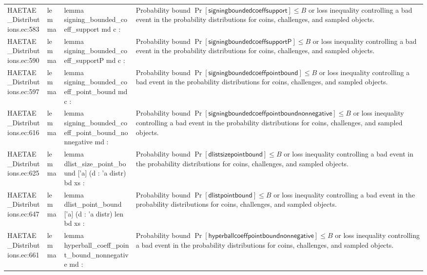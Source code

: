 \documentclass[10pt]{article}
\begin{document}
\begin{longtable}{L{0.11\textwidth}L{0.055\textwidth}L{0.385\textwidth}L{0.41\textwidth}}
HAETAE\_\allowbreak{}Distributions.\allowbreak{}ec:\allowbreak{}583 & lemma & {\ttfamily\scriptsize lemma signing\_\allowbreak{}bounded\_\allowbreak{}coeff\_\allowbreak{}support md c :} & Probability bound $\Pr[\mathsf{signingboundedcoeffsupport}]\le B$ or loss inequality controlling a bad event in the probability distributions for coins, challenges, and sampled objects. \\
HAETAE\_\allowbreak{}Distributions.\allowbreak{}ec:\allowbreak{}590 & lemma & {\ttfamily\scriptsize lemma signing\_\allowbreak{}bounded\_\allowbreak{}coeff\_\allowbreak{}supportP md c :} & Probability bound $\Pr[\mathsf{signingboundedcoeffsupportP}]\le B$ or loss inequality controlling a bad event in the probability distributions for coins, challenges, and sampled objects. \\
HAETAE\_\allowbreak{}Distributions.\allowbreak{}ec:\allowbreak{}597 & lemma & {\ttfamily\scriptsize lemma signing\_\allowbreak{}bounded\_\allowbreak{}coeff\_\allowbreak{}point\_\allowbreak{}bound md c :} & Probability bound $\Pr[\mathsf{signingboundedcoeffpointbound}]\le B$ or loss inequality controlling a bad event in the probability distributions for coins, challenges, and sampled objects. \\
HAETAE\_\allowbreak{}Distributions.\allowbreak{}ec:\allowbreak{}616 & lemma & {\ttfamily\scriptsize lemma signing\_\allowbreak{}bounded\_\allowbreak{}coeff\_\allowbreak{}point\_\allowbreak{}bound\_\allowbreak{}nonnegative md :} & Probability bound $\Pr[\mathsf{signingboundedcoeffpointboundnonnegative}]\le B$ or loss inequality controlling a bad event in the probability distributions for coins, challenges, and sampled objects. \\
HAETAE\_\allowbreak{}Distributions.\allowbreak{}ec:\allowbreak{}625 & lemma & {\ttfamily\scriptsize lemma dlist\_\allowbreak{}size\_\allowbreak{}point\_\allowbreak{}bound ['a] (d : 'a distr) bd xs :} & Probability bound $\Pr[\mathsf{dlistsizepointbound}]\le B$ or loss inequality controlling a bad event in the probability distributions for coins, challenges, and sampled objects. \\
HAETAE\_\allowbreak{}Distributions.\allowbreak{}ec:\allowbreak{}647 & lemma & {\ttfamily\scriptsize lemma dlist\_\allowbreak{}point\_\allowbreak{}bound ['a] (d : 'a distr) len bd xs :} & Probability bound $\Pr[\mathsf{dlistpointbound}]\le B$ or loss inequality controlling a bad event in the probability distributions for coins, challenges, and sampled objects. \\
HAETAE\_\allowbreak{}Distributions.\allowbreak{}ec:\allowbreak{}661 & lemma & {\ttfamily\scriptsize lemma hyperball\_\allowbreak{}coeff\_\allowbreak{}point\_\allowbreak{}bound\_\allowbreak{}nonnegative md :} & Probability bound $\Pr[\mathsf{hyperballcoeffpointboundnonnegative}]\le B$ or loss inequality controlling a bad event in the probability distributions for coins, challenges, and sampled objects. \\

\end{longtable}
\end{document}
